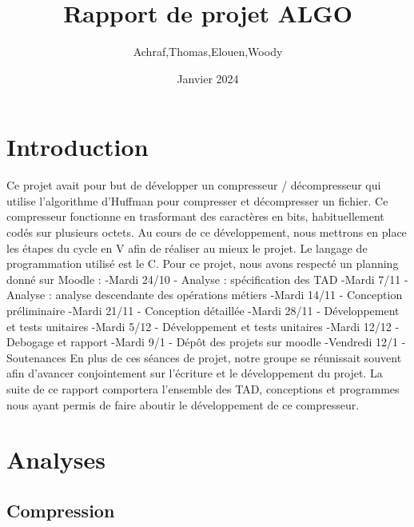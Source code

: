 \documentclass{article}
\begin{document}
\title{Rapport de projet ALGO}

{\centering
\author{Achraf,Thomas,Elouen,Woody}
\par}
\date{Janvier 2024}
\maketitle


\thispagestyle{empty}

\newpage

\tableofcontents

\newpage

\maketitle

\section{\textbf{Introduction}}

Ce projet avait pour but de développer un compresseur / décompresseur qui utilise l'algorithme d'Huffman pour compresser et décompresser un fichier. Ce compresseur fonctionne en trasformant des caractères en bits, habituellement codés sur plusieurs octets.  Au cours de ce développement, nous mettrons en place les étapes du cycle en V afin de réaliser au mieux le projet. Le langage de programmation utilisé est le C. Pour ce projet, nous avons respecté un planning donné sur Moodle : 
-Mardi 24/10 - Analyse : spécification des TAD
-Mardi 7/11 - Analyse : analyse descendante des opérations métiers
-Mardi 14/11 - Conception préliminaire
-Mardi 21/11 - Conception détaillée
-Mardi 28/11 - Développement et tests unitaires
-Mardi 5/12 - Développement et tests unitaires
-Mardi 12/12 - Debogage et rapport
-Mardi 9/1 - Dépôt des projets sur moodle
-Vendredi 12/1 - Soutenances
En plus de ces séances de projet, notre groupe se réunissait souvent afin d'avancer conjointement sur l'écriture et le développement du projet. La suite de ce rapport comportera l'ensemble des TAD, conceptions et programmes nous ayant permis de faire aboutir le développement de ce compresseur.


\newpage


\section{\textbf{Analyses}}

\subsection{Compression}
\end{document}
